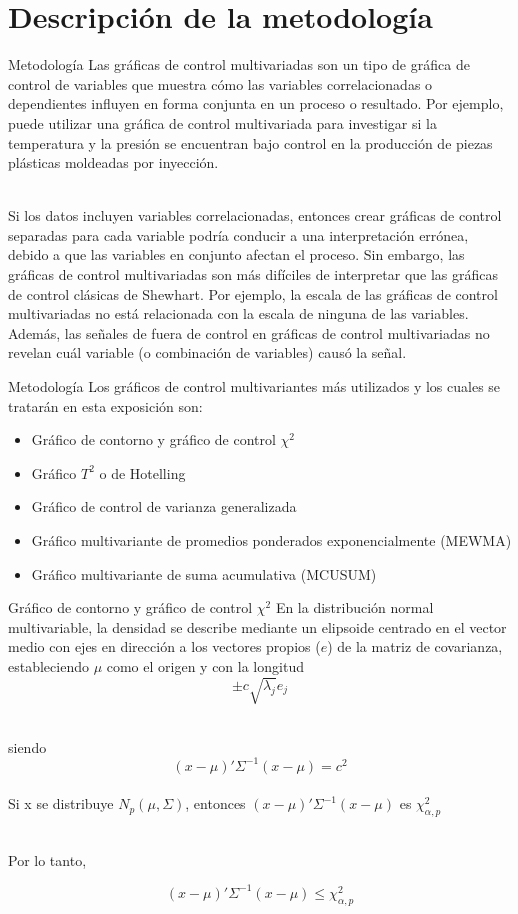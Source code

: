 \documentclass[10pt]{beamer}
\begin{document}
\section{Descripción de la metodología}
\begin{frame}{Metodología}
Las gráficas de control multivariadas son un tipo de gráfica de control de variables que muestra cómo las variables correlacionadas o dependientes influyen en forma conjunta en un proceso o resultado. Por ejemplo, puede utilizar una gráfica de control multivariada para investigar si la temperatura y la presión se encuentran bajo control en la producción de piezas plásticas moldeadas por inyección.

~\\Si los datos incluyen variables correlacionadas, entonces crear gráficas de control separadas para cada variable podría conducir a una interpretación errónea, debido a que las variables en conjunto afectan el proceso. Sin embargo, las gráficas de control multivariadas son más difíciles de interpretar que las gráficas de control clásicas de Shewhart. Por ejemplo, la escala de las gráficas de control multivariadas no está relacionada con la escala de ninguna de las variables. Además, las señales de fuera de control en gráficas de control multivariadas no revelan cuál variable (o combinación de variables) causó la señal.
\end{frame}

\begin{frame}{Metodología}
Los gráficos de control multivariantes más utilizados y los cuales se tratarán en esta exposición son:
\begin{itemize}
\item Gráfico de contorno y gráfico de control $\chi^2$
\item Gráfico $T^2$ o de Hotelling
\item Gráfico de control de varianza generalizada
\item Gráfico multivariante de promedios ponderados exponencialmente (MEWMA)
\item Gráfico multivariante de suma acumulativa (MCUSUM)
\end{itemize}
\end{frame}

\begin{frame}{Gráfico de contorno y gráfico de control $\chi^2$}
En la distribución normal multivariable, la densidad se describe mediante un elipsoide centrado en el vector medio con ejes en dirección a los vectores propios ($e$) de la matriz de covarianza, estableciendo $\mu$ como el origen y con la longitud
$$\pm c\sqrt{\lambda_j}e_j$$

~\\siendo 
$$(x-\mu)'\Sigma^{-1}(x-\mu)=c^2$$
~\\Si x se distribuye $N_{p}(\mu,\Sigma)$, entonces $(x-\mu)'\Sigma^{-1}(x-\mu)$ es $\chi^2_{\alpha,p}$

~\\Por lo tanto,

$$(x-\mu)'\Sigma^{-1}(x-\mu)\leq \chi^2_{\alpha,p}$$
\end{frame}
\end{document}

